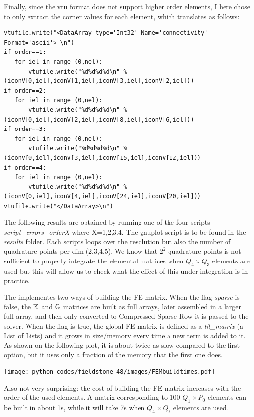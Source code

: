 Finally, since the vtu format does not support higher order elements, I 
here chose to only extract the corner values for each element, 
which translates as follows:
\begin{lstlisting}
vtufile.write("<DataArray type='Int32' Name='connectivity' Format='ascii'> \n")
if order==1:
   for iel in range (0,nel):
       vtufile.write("%d%d%d%d\n" %(iconV[0,iel],iconV[1,iel],iconV[3,iel],iconV[2,iel]))
if order==2:
   for iel in range (0,nel):
       vtufile.write("%d%d%d%d\n" %(iconV[0,iel],iconV[2,iel],iconV[8,iel],iconV[6,iel]))
if order==3:
   for iel in range (0,nel):
       vtufile.write("%d%d%d%d\n" %(iconV[0,iel],iconV[3,iel],iconV[15,iel],iconV[12,iel]))
if order==4:
   for iel in range (0,nel):
       vtufile.write("%d%d%d%d\n" %(iconV[0,iel],iconV[4,iel],iconV[24,iel],iconV[20,iel]))
vtufile.write("</DataArray>\n")
\end{lstlisting}


The following results are obtained by running one of the four scripts 
{\sl script\_errors\_orderX} 
where X=1,2,3,4. The gnuplot script is to be found in the {\sl results} folder.
Each scripts loops over the resolution but also the number of quadrature points per dim
(2,3,4,5). We know that $2^2$ quadrature points is not sufficient to properly 
integrate the elemental matrices when $Q_4\times Q_3$ elements are used but 
this will allow us to check what the effect of this under-integration is in practice.

The \stone implementes two ways of building the FE matrix. When the flag {\sl sparse} 
is false, the ${\mathbb{K}}$ and ${\mathbb{G}}$ matrices are built as full arrays, later assembled in a
larger full array, and then only converted to Compressed Sparse Row 
it is passed to the solver. When the flag is true, the global FE matrix 
is defined as a {\sl lil\_matrix} (a List of Lists) and it grows in size/memory
every time a new term is added to it. As shown on the following plot, it is about 
twice as slow compared to the first option, but it uses only a fraction of the memory
that the first one does. 

\begin{center}
\texttt{[image: python\_codes/fieldstone\_48/images/FEMbuildtimes.pdf]}
\end{center}

Also not very surprising: the cost of building the FE matrix increases with the order
of the used elements. A matrix corresponding to 100 $Q_1\times P_0$ elements can be 
built in about 1s, while it will take 7s when $Q_4 \times Q_3$ elements are used. 


